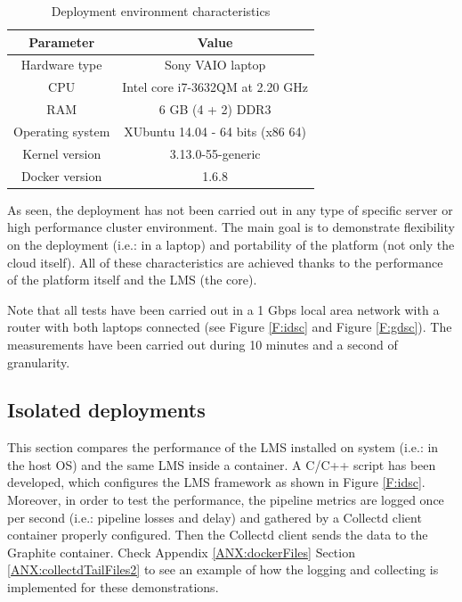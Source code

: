 \begin{table}[htb]
\caption{Deployment environment characteristics}
\begin{center}
\begin{tabular}{|c|c|}
\hline
{\bf Parameter} & {\bf Value} \\ \hline \hline
Hardware type        & Sony VAIO laptop \\ \hline
CPU        & Intel core i7-3632QM at 2.20 GHz  \\ \hline
RAM        & 6 GB (4 + 2) DDR3 \\ \hline
Operating system        & XUbuntu 14.04 - 64 bits (x86 64)  \\ \hline
Kernel version        & 3.13.0-55-generic  \\ \hline
Docker version        & 1.6.8  \\ \hline
\end{tabular}
\label{T:dec}
\end{center}
\end{table}

As seen, the deployment has not been carried out in any type of specific server or high performance cluster environment. The main goal is to demonstrate flexibility on the deployment (i.e.: in a laptop) and portability of the platform (not only the cloud itself). All of these characteristics are achieved thanks to the performance of the platform itself and the LMS (the core).

Note that all tests have been carried out in a 1 Gbps local area network with a router with both laptops connected (see Figure \ref{F:idsc} and Figure \ref{F:gdsc}). The measurements have been carried out during 10 minutes and a second of granularity.

\subsection{Isolated deployments}

This section compares the performance of the LMS installed on system (i.e.: in the host OS) and the same LMS inside a container. A C/C++ script has been developed, which configures the LMS framework as shown in Figure \ref{F:idsc}. Moreover, in order to test the performance, the pipeline metrics are logged once per second (i.e.: pipeline losses and delay) and gathered by a Collectd client container properly configured. Then the Collectd client sends the data to the Graphite container. Check Appendix \ref{ANX:dockerFiles} Section \ref{ANX:collectdTailFiles2} to see an example of how the logging and collecting is implemented for these demonstrations. 

